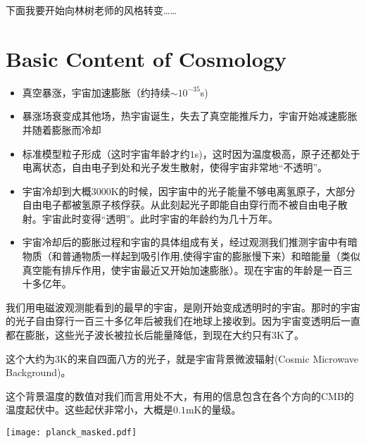 \documentclass[CJK]{beamer}
\begin{document}
\begin{frame}
\bch
下面我要开始向林树老师的风格转变……
\skipline

\ech
\end{frame}


\section{Basic Content of Cosmology}


\begin{frame}
\bch
\begin{itemize}
\item{真空暴涨，宇宙加速膨胀（约持续$\sim 10^{-35}$s)}
\item{暴涨场衰变成其他场，热宇宙诞生，失去了真空能推斥力，宇宙开始减速膨胀并随着膨胀而冷却}
\item{标准模型粒子形成（这时宇宙年龄才约$1$s)，这时因为温度极高，原子还都处于电离状态，自由电子到处和光子发生散射，使得宇宙非常地“不透明”。}
\item{宇宙冷却到大概$3000$K的时候，因宇宙中的光子能量不够电离氢原子，大部分自由电子都被氢原子核俘获。从此刻起光子即能自由穿行而不被自由电子散射。宇宙此时变得“透明”。此时宇宙的年龄约为几十万年。}
\item{宇宙冷却后的膨胀过程和宇宙的具体组成有关，经过观测我们推测宇宙中有暗物质（和普通物质一样起到吸引作用,使得宇宙的膨胀慢下来）和暗能量（类似真空能有排斥作用，使宇宙最近又开始加速膨胀）。现在宇宙的年龄是一百三十多亿年。}
\end{itemize}


\ech
\end{frame}

\begin{frame}
\bch
我们用电磁波观测能看到的最早的宇宙，是刚开始变成透明时的宇宙。那时的宇宙的光子自由穿行一百三十多亿年后被我们在地球上接收到。因为宇宙变透明后一直都在膨胀，这些光子波长被拉长后能量降低，到现在大约只有3K了。

\skipline
这个大约为3K的来自四面八方的光子，就是宇宙背景微波辐射(Cosmic Microwave Background)。
\ech
\end{frame}


\begin{frame}
\bch
这个背景温度的数值对我们而言用处不大，有用的信息包含在各个方向的CMB的温度起伏中。这些起伏非常小，大概是$0.1$mK的量级。

\texttt{[image: planck\_masked.pdf]}
\ech
\end{frame}
\end{document}
